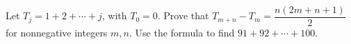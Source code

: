 Let $T_j=1+2+\cdots+j$, with $T_0=0$. Prove that $T_{m+n}-T_m=\dfrac{n(2m+n+1)}{2}$ for nonnegative integers $m,n$. Use the formula to find $91+92+\cdots+100$.
